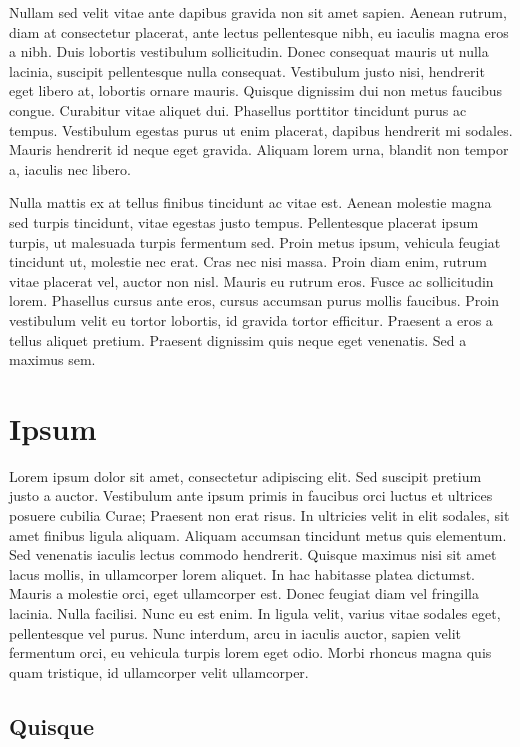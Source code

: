 Nullam sed velit vitae ante dapibus gravida non sit amet sapien. Aenean rutrum, diam at consectetur placerat, ante lectus pellentesque nibh, eu iaculis magna eros a nibh. Duis lobortis vestibulum sollicitudin. Donec consequat mauris ut nulla lacinia, suscipit pellentesque nulla consequat. Vestibulum justo nisi, hendrerit eget libero at, lobortis ornare mauris. Quisque dignissim dui non metus faucibus congue. Curabitur vitae aliquet dui. Phasellus porttitor tincidunt purus ac tempus. Vestibulum egestas purus ut enim placerat, dapibus hendrerit mi sodales. Mauris hendrerit id neque eget gravida. Aliquam lorem urna, blandit non tempor a, iaculis nec libero.

Nulla mattis ex at tellus finibus tincidunt ac vitae est. Aenean molestie magna sed turpis tincidunt, vitae egestas justo tempus. Pellentesque placerat ipsum turpis, ut malesuada turpis fermentum sed. Proin metus ipsum, vehicula feugiat tincidunt ut, molestie nec erat. Cras nec nisi massa. Proin diam enim, rutrum vitae placerat vel, auctor non nisl. Mauris eu rutrum eros. Fusce ac sollicitudin lorem. Phasellus cursus ante eros, cursus accumsan purus mollis faucibus. Proin vestibulum velit eu tortor lobortis, id gravida tortor efficitur. Praesent a eros a tellus aliquet pretium. Praesent dignissim quis neque eget venenatis. Sed a maximus sem.

\chapter{Ipsum}

Lorem ipsum dolor sit amet, consectetur adipiscing elit. Sed suscipit pretium justo a auctor. Vestibulum ante ipsum primis in faucibus orci luctus et ultrices posuere cubilia Curae; Praesent non erat risus. In ultricies velit in elit sodales, sit amet finibus ligula aliquam. Aliquam accumsan tincidunt metus quis elementum. Sed venenatis iaculis lectus commodo hendrerit. Quisque maximus nisi sit amet lacus mollis, in ullamcorper lorem aliquet. In hac habitasse platea dictumst. Mauris a molestie orci, eget ullamcorper est. Donec feugiat diam vel fringilla lacinia. Nulla facilisi. Nunc eu est enim. In ligula velit, varius vitae sodales eget, pellentesque vel purus. Nunc interdum, arcu in iaculis auctor, sapien velit fermentum orci, eu vehicula turpis lorem eget odio. Morbi rhoncus magna quis quam tristique, id ullamcorper velit ullamcorper.

\section{Quisque}

